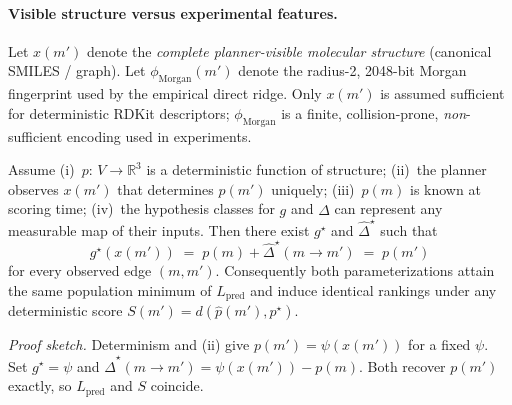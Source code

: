 \paragraph{Visible structure versus experimental features.}
Let $x(m')$ denote the \emph{complete planner-visible molecular structure} (canonical SMILES / graph). Let $\phi_{\mathrm{Morgan}}(m')$ denote the radius-2, 2048-bit Morgan fingerprint used by the empirical direct ridge. Only $x(m')$ is assumed sufficient for deterministic RDKit descriptors; $\phi_{\mathrm{Morgan}}$ is a finite, collision-prone, \emph{non}-sufficient encoding used in experiments.

\begin{proposition}
\label{prop:equiv}
Assume (i)~$p{:}\,V\!\to\!\mathbb{R}^{3}$ is a deterministic function of structure; (ii)~the planner observes $x(m')$ that determines $p(m')$ uniquely; (iii)~$p(m)$ is known at scoring time; (iv)~the hypothesis classes for $g$ and $\widehat{\Delta}$ can represent any measurable map of their inputs. Then there exist $g^\star$ and $\widehat{\Delta}^\star$ such that
\[
g^\star\!\left(x(m')\right)
\;=\;
p(m)+\widehat{\Delta}^\star(m\!\to\!m')
\;=\;
p(m')
\]
for every observed edge $(m,m')$. Consequently both parameterizations attain the same population minimum of $L_{\mathrm{pred}}$ and induce identical rankings under any deterministic score $S(m')=d(\widehat p(m'),p^\star)$.
\end{proposition}

\noindent\textit{Proof sketch.}
Determinism and (ii) give $p(m')=\psi\!\left(x(m')\right)$ for a fixed $\psi$. Set $g^\star=\psi$ and $\widehat{\Delta}^\star(m\!\to\!m')=\psi\!\left(x(m')\right)-p(m)$. Both recover $p(m')$ exactly, so $L_{\mathrm{pred}}$ and $S$ coincide.

